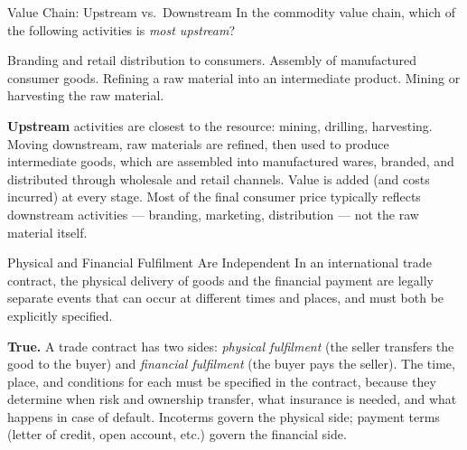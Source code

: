 \documentclass[paper=a5]{scrartcl}
\begin{document}
\begin{question}[type=mc]{Value Chain: Upstream vs.\ Downstream}
In the commodity value chain, which of the following activities is
\emph{most upstream}?
\begin{choices}
  \choice        Branding and retail distribution to consumers.
  \choice        Assembly of manufactured consumer goods.
  \choice        Refining a raw material into an intermediate product.
  \correctchoice Mining or harvesting the raw material.
\end{choices}
\begin{solution}
  \textbf{Upstream} activities are closest to the resource: mining, drilling,
  harvesting. Moving downstream, raw materials are refined, then used to
  produce intermediate goods, which are assembled into manufactured wares,
  branded, and distributed through wholesale and retail channels.
  Value is added (and costs incurred) at every stage. Most of the final
  consumer price typically reflects downstream activities --- branding,
  marketing, distribution --- not the raw material itself.
\end{solution}
\end{question}

\begin{question}[type=tf]{Physical and Financial Fulfilment Are Independent}
In an international trade contract, the physical delivery of goods and the
financial payment are legally separate events that can occur at different
times and places, and must both be explicitly specified.
\truefalse[true]
\begin{solution}
  \textbf{True.} A trade contract has two sides: \emph{physical fulfilment}
  (the seller transfers the good to the buyer) and \emph{financial fulfilment}
  (the buyer pays the seller). The time, place, and conditions for each must
  be specified in the contract, because they determine when risk and ownership
  transfer, what insurance is needed, and what happens in case of default.
  Incoterms govern the physical side; payment terms (letter of credit, open
  account, etc.) govern the financial side.
\end{solution}
\end{question}
\end{document}
